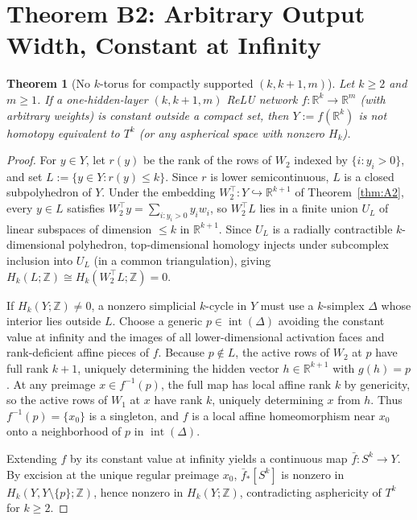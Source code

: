 \documentclass[11pt]{article}
\theoremstyle{plain}
\newtheorem{theorem}{Theorem}
\theoremstyle{definition}
\theoremstyle{remark}
\DeclareMathOperator{\intr}{int}
\begin{document}
\section{Theorem B2: Arbitrary Output Width, Constant at Infinity}\label{sec:B2}

\begin{theorem}[No $k$-torus for compactly supported $(k, k+1, m)$]\label{thm:B2}
Let $k \ge 2$ and $m \ge 1$. If a one-hidden-layer $(k, k+1, m)$ ReLU network $f : \mathbb{R}^k \to \mathbb{R}^m$ (with arbitrary weights) is constant outside a compact set, then $Y := f(\mathbb{R}^k)$ is not homotopy equivalent to $T^k$ (or any aspherical space with nonzero $H_k$).
\end{theorem}

\begin{proof}
For $y \in Y$, let $r(y)$ be the rank of the rows of $W_2$ indexed by $\{i : y_i > 0\}$, and set $L := \{y \in Y : r(y) \le k\}$. Since $r$ is lower semicontinuous, $L$ is a closed subpolyhedron of $Y$. Under the embedding $W_2^\top : Y \hookrightarrow \mathbb{R}^{k+1}$ of Theorem~\ref{thm:A2}, every $y \in L$ satisfies $W_2^\top y = \sum_{i : y_i > 0} y_i w_i$, so $W_2^\top L$ lies in a finite union $U_L$ of linear subspaces of dimension $\le k$ in $\mathbb{R}^{k+1}$. Since $U_L$ is a radially contractible $k$-dimensional polyhedron, top-dimensional homology injects under subcomplex inclusion into $U_L$ (in a common triangulation), giving $H_k(L; \mathbb{Z}) \cong H_k(W_2^\top L; \mathbb{Z}) = 0$.

If $H_k(Y; \mathbb{Z}) \neq 0$, a nonzero simplicial $k$-cycle in $Y$ must use a $k$-simplex $\Delta$ whose interior lies outside $L$. Choose a generic $p \in \intr(\Delta)$ avoiding the constant value at infinity and the images of all lower-dimensional activation faces and rank-deficient affine pieces of $f$. Because $p \notin L$, the active rows of $W_2$ at $p$ have full rank $k + 1$, uniquely determining the hidden vector $h \in \mathbb{R}^{k+1}$ with $g(h) = p$. At any preimage $x \in f^{-1}(p)$, the full map has local affine rank $k$ by genericity, so the active rows of $W_1$ at $x$ have rank $k$, uniquely determining $x$ from $h$. Thus $f^{-1}(p) = \{x_0\}$ is a singleton, and $f$ is a local affine homeomorphism near $x_0$ onto a neighborhood of $p$ in $\intr(\Delta)$.

Extending $f$ by its constant value at infinity yields a continuous map $\bar{f} : S^k \to Y$. By excision at the unique regular preimage $x_0$, $\bar{f}_*[S^k]$ is nonzero in $H_k(Y, Y \setminus \{p\}; \mathbb{Z})$, hence nonzero in $H_k(Y; \mathbb{Z})$, contradicting asphericity of $T^k$ for $k \ge 2$.
\end{proof}
\end{document}
